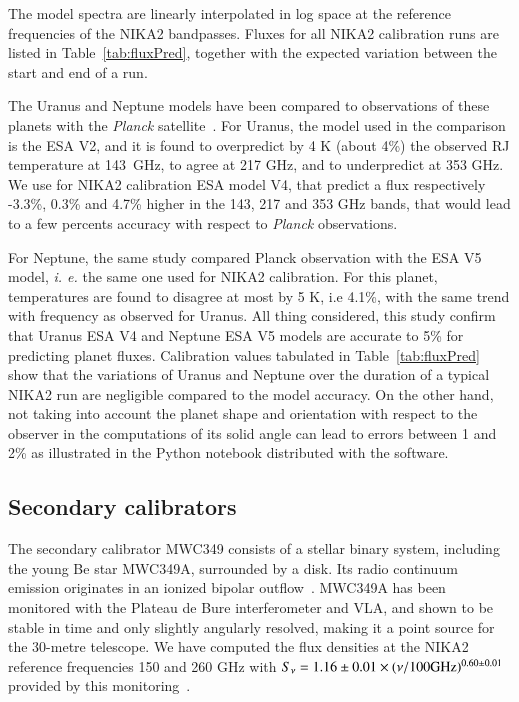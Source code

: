 The model spectra are linearly interpolated in log space at the
reference frequencies of the NIKA2 bandpasses. Fluxes for all NIKA2
calibration runs are listed in Table~\ref{tab:fluxPred}, together with
the expected variation between the start and end of a run. 

The Uranus and Neptune models have been compared to 
observations of these planets with the \emph{Planck}
satellite~\cite{PLCK-LII}.
For Uranus, the model used in the comparison
is the ESA V2, and it is found to overpredict by 4 K (about 4\%) the
observed RJ temperature at 143~GHz, to agree at 217 GHz, and
to underpredict at 353 GHz. We use for NIKA2 calibration ESA model V4,
that predict a flux respectively -3.3\%, 0.3\% and 4.7\% higher in the
143, 217 and 353 GHz bands, that would lead to a few percents accuracy
with respect to \emph{Planck} observations.


For Neptune, the same study compared Planck observation with the ESA V5
model, {\it i. e.} the same one used for NIKA2 calibration. For this
planet, temperatures are found to disagree at most by 5 K, i.e 4.1\%,
with the same trend with frequency as observed for Uranus. All thing
considered, this study confirm that Uranus ESA V4 and Neptune ESA V5
models are accurate to 5\% for predicting planet fluxes. Calibration
values tabulated in Table~\ref{tab:fluxPred} show that the variations
of Uranus and Neptune over the duration of a typical NIKA2 run are
negligible compared to the model accuracy. On the other hand, not
taking into account the planet shape and orientation with respect to
the observer in the computations of its solid angle can lead to errors
between 1 and 2\% as illustrated in the Python notebook
\cite{gith-Haussel-Note}
distributed with the software.


\subsection{Secondary calibrators}
\label{se:ref_flux_secondaries}


The secondary calibrator MWC349 consists of a stellar
binary system, including the young Be star MWC349A, surrounded by a
disk. Its radio continuum emission
originates in an ionized bipolar outflow~\cite{Tafoya}.  MWC349A has
been monitored with the Plateau de Bure interferometer and VLA, and
shown to be stable in time and only slightly angularly resolved,
making it a point source for the 30-metre telescope.
We have computed the flux densities at the NIKA2 reference frequencies 150 and
260 GHz with $S_\nu = 1.16\pm0.01 \times
(\nu/100 \rm{GHz})^{0.60\pm0.01}$ provided by this
monitoring~\cite{krips}.

